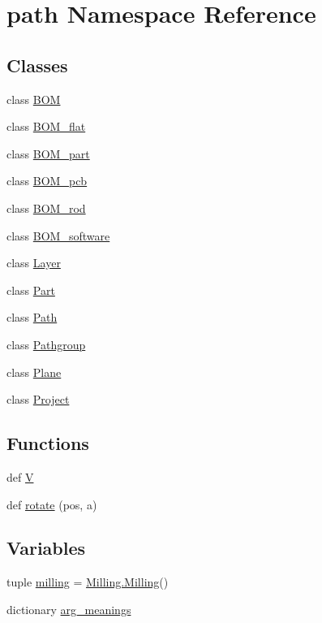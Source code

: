 \hypertarget{namespacepath}{}\section{path Namespace Reference}
\label{namespacepath}
\subsection*{Classes}
\begin{DoxyCompactItemize}
\item 
class \hyperlink{classpath_1_1_b_o_m}{B\+O\+M}
\item 
class \hyperlink{classpath_1_1_b_o_m__flat}{B\+O\+M\+\_\+flat}
\item 
class \hyperlink{classpath_1_1_b_o_m__part}{B\+O\+M\+\_\+part}
\item 
class \hyperlink{classpath_1_1_b_o_m__pcb}{B\+O\+M\+\_\+pcb}
\item 
class \hyperlink{classpath_1_1_b_o_m__rod}{B\+O\+M\+\_\+rod}
\item 
class \hyperlink{classpath_1_1_b_o_m__software}{B\+O\+M\+\_\+software}
\item 
class \hyperlink{classpath_1_1_layer}{Layer}
\item 
class \hyperlink{classpath_1_1_part}{Part}
\item 
class \hyperlink{classpath_1_1_path}{Path}
\item 
class \hyperlink{classpath_1_1_pathgroup}{Pathgroup}
\item 
class \hyperlink{classpath_1_1_plane}{Plane}
\item 
class \hyperlink{classpath_1_1_project}{Project}
\end{DoxyCompactItemize}
\subsection*{Functions}
\begin{DoxyCompactItemize}
\item 
def \hyperlink{namespacepath_a1d2c06ebecd0a735e9c87e8b97ee9d1a}{V}
\item 
def \hyperlink{namespacepath_a9a6d2cc32e9e70e7f2243a31c3a1f2a5}{rotate} (pos, a)
\end{DoxyCompactItemize}
\subsection*{Variables}
\begin{DoxyCompactItemize}
\item 
tuple \hyperlink{namespacepath_a22348be460eb3c510b50da1d6643feaa}{milling} = \hyperlink{class_milling_1_1_milling}{Milling.\+Milling}()
\item 
dictionary \hyperlink{namespacepath_ac3facb45d2ec1fec87614d74d381d058}{arg\+\_\+meanings}
\end{DoxyCompactItemize}


